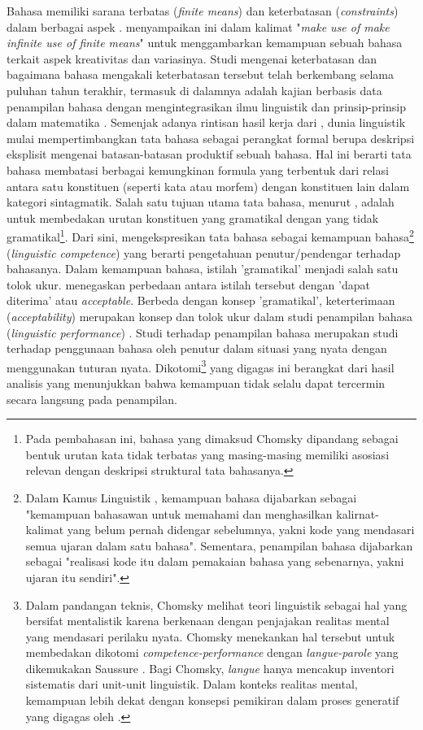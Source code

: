 Bahasa memiliki sarana terbatas (\textit{finite means}) dan keterbatasan (\textit{constraints}) dalam berbagai aspek \citep{von1972origin}. \cite{von1972origin} menyampaikan ini dalam kalimat "\textit{make use of make infinite use of finite means}" untuk menggambarkan kemampuan sebuah bahasa terkait aspek kreativitas dan variasinya. Studi mengenai keterbatasan dan bagaimana bahasa mengakali keterbatasan tersebut telah berkembang selama puluhan tahun terakhir, termasuk di dalamnya adalah kajian berbasis data penampilan bahasa dengan mengintegrasikan ilmu linguistik dan prinsip-prinsip dalam matematika \citep{chomsky1965syntactic}. Semenjak adanya rintisan hasil kerja dari \cite{chomsky1957syntactic}, dunia linguistik mulai mempertimbangkan tata bahasa sebagai perangkat formal berupa deskripsi eksplisit mengenai batasan-batasan produktif sebuah bahasa. Hal ini berarti tata bahasa membatasi berbagai kemungkinan formula yang terbentuk dari relasi antara satu konstituen (seperti kata atau morfem) dengan konstituen lain dalam kategori sintagmatik. Salah satu tujuan utama tata bahasa, menurut \cite{chomsky1965syntactic}, adalah untuk membedakan urutan konstituen yang gramatikal dengan yang tidak gramatikal\footnote{Pada pembahasan ini, bahasa yang dimaksud Chomsky dipandang sebagai bentuk urutan kata tidak terbatas yang masing-masing memiliki asosiasi relevan dengan deskripsi struktural tata bahasanya.}. Dari sini, \cite{chomsky1965syntactic} mengekspresikan tata bahasa sebagai kemampuan bahasa\footnote{Dalam Kamus Linguistik \citep{kridalaksana2008kamus}, kemampuan bahasa dijabarkan sebagai "kemampuan bahasawan untuk memahami dan menghasilkan kalirnat-kalimat yang belum pernah didengar sebelumnya, yakni kode yang mendasari semua ujaran dalam satu bahasa". Sementara, penampilan bahasa dijabarkan sebagai "realisasi kode itu dalam pemakaian bahasa yang sebenarnya, yakni ujaran itu sendiri".} (\textit{linguistic competence}) yang berarti pengetahuan penutur/pendengar terhadap bahasanya. Dalam kemampuan bahasa, istilah 'gramatikal' menjadi salah satu tolok ukur. \cite{chomsky1965syntactic} menegaskan perbedaan antara istilah tersebut dengan 'dapat diterima' atau \textit{acceptable}. Berbeda dengan konsep 'gramatikal', keterterimaan (\textit{acceptability}) merupakan konsep dan tolok ukur dalam studi penampilan bahasa (\textit{linguistic performance}) \citep{chomsky1965syntactic}. Studi terhadap penampilan bahasa merupakan studi terhadap penggunaan bahasa oleh penutur dalam situasi yang nyata dengan menggunakan tuturan nyata. Dikotomi\footnote{Dalam pandangan teknis, Chomsky melihat teori linguistik sebagai hal yang bersifat mentalistik karena berkenaan dengan penjajakan realitas mental yang mendasari perilaku nyata. Chomsky menekankan hal tersebut untuk membedakan dikotomi \textit{competence-performance} dengan \textit{langue-parole} yang dikemukakan Saussure \citep{key2017course}. Bagi Chomsky, \textit{langue} hanya mencakup inventori sistematis dari unit-unit linguistik. Dalam konteks realitas mental, kemampuan lebih dekat dengan konsepsi pemikiran dalam proses generatif yang digagas oleh \cite{von1972origin}.} yang digagas \cite{chomsky1965syntactic} ini berangkat dari hasil analisis yang menunjukkan bahwa kemampuan tidak selalu dapat tercermin secara langsung pada penampilan.

